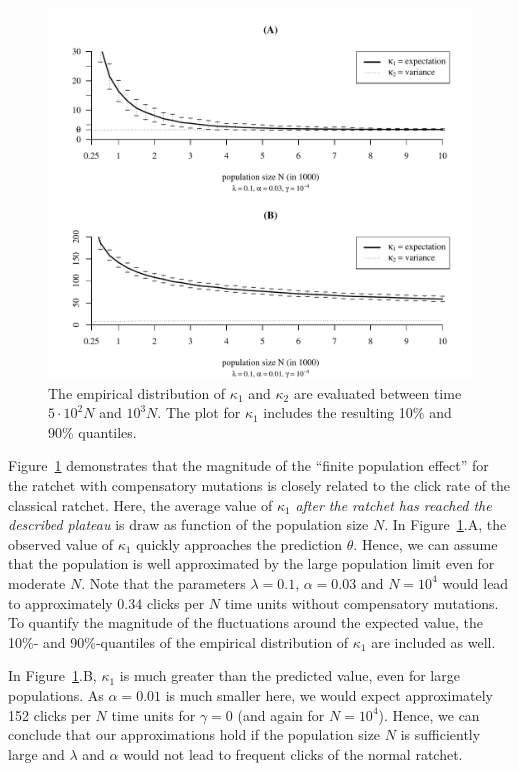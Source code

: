 \begin{figure}[h]
  \begin{center}
	\includegraphics[width=13cm]{img/conv.pdf}
   \end{center}
  \caption{\label{sim:f:konv} The empirical distribution of $\kappa_1$ and
    $\kappa_2$ are evaluated between time $5\cdot 10^2 N$ and $10^3
    N$. The plot for $\kappa_1$ includes the resulting 10\% and 90\%
    quantiles.}
\end{figure}

\noindent
Figure~\ref{sim:f:konv} demonstrates that the magnitude of the ``finite
population effect'' for the ratchet with compensatory mutations is closely
related to the click rate of the classical ratchet. Here, the average value of
$\kappa_1$ \emph{after the ratchet has reached the described plateau} is draw as
function of the population size $N$. In Figure~\ref{sim:f:konv}.A, the
observed value of $\kappa_1$ quickly approaches the prediction $\theta$. Hence,
we can assume that the population is well approximated by the large population
limit even for moderate $N$. Note that the parameters $\lambda = 0.1$,
$\alpha = 0.03$ and $N=10^4$ would lead to approximately 0.34 clicks per $N$
time units without compensatory mutations. To quantify the magnitude of the
fluctuations around the expected value, the 10\%- and 90\%-quantiles of the
empirical distribution of $\kappa_1$ are included as well.

In Figure~\ref{sim:f:konv}.B, $\kappa_1$ is much greater than the
predicted value, even for large populations. As $\alpha = 0.01$ is much smaller here, we would expect
approximately 152 clicks per $N$ time units for $\gamma = 0$ (and again for
$N=10^4$). Hence, we can conclude that our approximations hold if the population size $N$ is sufficiently
large and $\lambda$ and $\alpha$ would not lead to frequent clicks of the normal
ratchet.

